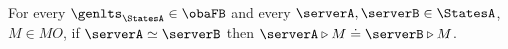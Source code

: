 





\begin{lemma}
  \label{lem:fw-eq-id-mb}
  For every $\genlts_\StatesA \in \obaFB$ and every
  $\serverA, \serverB \in \StatesA$, $M \in MO$,
  if $\serverA \simeq \serverB$ then $\serverA \triangleright M \doteq \serverB \triangleright M$.
\end{lemma}


